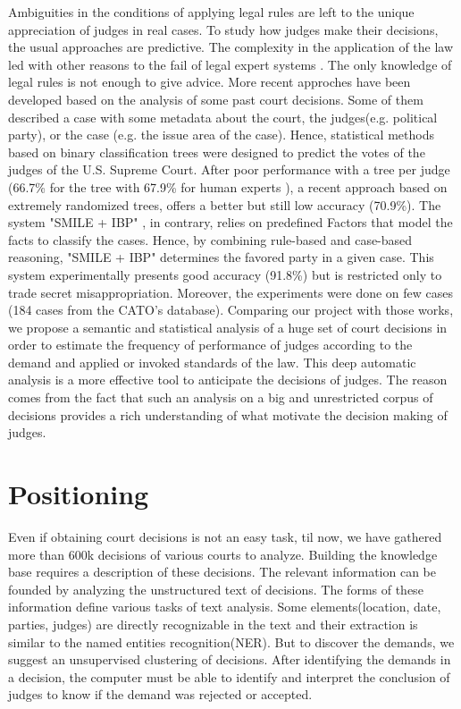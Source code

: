\documentclass[runningheads,a4paper]{llncs}
\begin{document}
Ambiguities in the conditions of applying legal rules are left to the unique appreciation of judges in real cases. To study how judges make their decisions, the usual approaches are predictive. The complexity in the application of the law led with other reasons to the fail of legal expert systems \cite{leith2010risefall}. The only knowledge of legal rules is not enough to give advice. More recent approches have been developed based on the analysis of some past court decisions. Some of them described a case with some metadata about the court, the judges(e.g. political party), or the case (e.g. the issue area of the case). Hence, statistical methods based on binary classification trees were designed to predict the votes of the judges of the U.S. Supreme Court. After poor performance with a tree per judge (66.7\% for the tree with 67.9\% for human experts \cite{martin2004competing}), a recent approach \cite{katz2014predicting} based on extremely randomized trees, offers a better but still low accuracy (70.9\%). The system "SMILE + IBP" \cite{Ashley2009}, in contrary, relies on predefined Factors that model the facts to classify the cases. Hence, by combining rule-based and case-based reasoning, "SMILE + IBP" determines the favored party in a given case. This system experimentally presents good accuracy (91.8\%) but is restricted only to trade secret misappropriation. Moreover, the experiments were done on few cases (184 cases from the CATO's database).
Comparing our project with those works, we propose a semantic and statistical analysis of a huge set of court decisions in order to estimate the frequency of performance of judges according to the demand and applied or invoked standards of the law. This deep automatic analysis is a more effective tool to anticipate the decisions of judges. The reason comes from the fact that such an analysis on a big and unrestricted corpus of decisions provides a rich understanding of what motivate the decision making of judges.

\section{Positioning}

Even if obtaining court decisions is not an easy task, til now, we have gathered more than 600k decisions of various courts to analyze. Building the knowledge base requires a description of these decisions. The relevant information can be founded by analyzing the unstructured text of decisions. The forms of these information define various tasks of text analysis. Some elements(location, date, parties, judges) are directly recognizable in the text and their extraction is similar to the named entities recognition(NER). But to discover the demands, we suggest an unsupervised clustering of decisions. After identifying the demands in a decision, the computer must be able to identify and interpret the  conclusion of judges to know if the demand was rejected or accepted.
\end{document}
